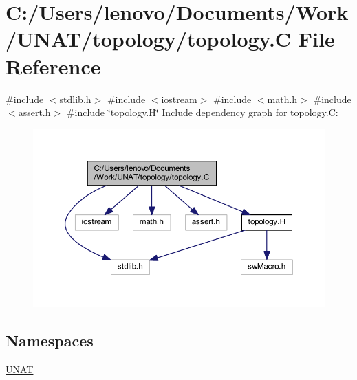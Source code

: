 \hypertarget{topology_2topology_8C}{}\section{C\+:/\+Users/lenovo/\+Documents/\+Work/\+U\+N\+A\+T/topology/topology.C File Reference}
\label{topology_2topology_8C}
{\ttfamily \#include $<$stdlib.\+h$>$}\newline
{\ttfamily \#include $<$iostream$>$}\newline
{\ttfamily \#include $<$math.\+h$>$}\newline
{\ttfamily \#include $<$assert.\+h$>$}\newline
{\ttfamily \#include \char`\"{}topology.\+H\char`\"{}}\newline
Include dependency graph for topology.\+C\+:
\nopagebreak
\begin{figure}[H]
\begin{center}
\leavevmode
\includegraphics[width=350pt]{topology_2topology_8C__incl}
\end{center}
\end{figure}
\subsection*{Namespaces}
\begin{DoxyCompactItemize}
\item 
 \mbox{\hyperlink{namespaceUNAT}{U\+N\+AT}}
\end{DoxyCompactItemize}
